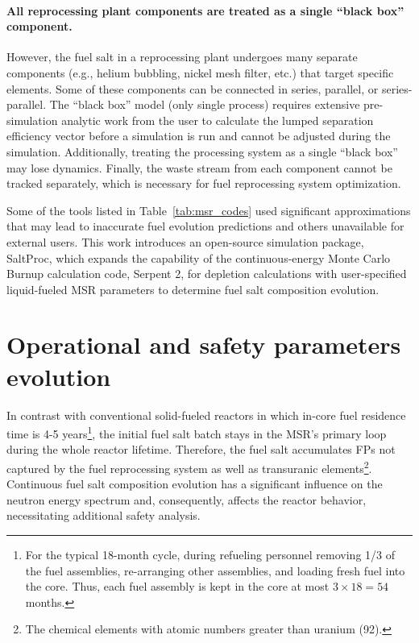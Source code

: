 \paragraph{All reprocessing plant components are treated as a single ``black 
	box'' component.} However, the fuel salt in a reprocessing plant undergoes 
many separate components (e.g., helium bubbling, nickel mesh filter, etc.) 
that target specific elements. Some of these components can be connected in 
series, parallel, or series-parallel. The ``black box'' model (only single 
process) requires extensive pre-simulation analytic work from the user to 
calculate the lumped separation efficiency vector before a simulation is run 
and cannot be adjusted during the simulation. Additionally, treating the 
processing system as a single ``black box'' may lose dynamics. Finally, the 
waste stream from each component cannot be tracked separately, which is 
necessary for fuel reprocessing system optimization.

Some of the tools listed in Table~\ref{tab:msr_codes} used significant  
approximations that may lead to inaccurate fuel evolution predictions and 
others unavailable for external users. This work introduces an 
open-source simulation package, SaltProc, which expands the capability of the 
continuous-energy Monte Carlo Burnup calculation code, Serpent 2, for 
depletion calculations with user-specified liquid-fueled \gls{MSR} parameters 
to determine fuel salt composition evolution.

\section{Operational and safety parameters evolution} 
\label{sec:saf-par-literature}
In contrast with conventional solid-fueled reactors in which in-core fuel 
residence time is 4-5 years\footnote{For the typical 18-month cycle, during 
refueling personnel removing 1/3 of the fuel assemblies, re-arranging other 
assemblies, and loading fresh fuel into the core. Thus, each fuel assembly is 
kept in the core at most $3\times 18=54$ months.}, the initial fuel salt batch 
stays in the \gls{MSR}'s primary loop during the whole reactor lifetime. 
Therefore, the fuel salt accumulates \glspl{FP} not captured by the fuel 
reprocessing system as well as transuranic elements\footnote{The chemical 
elements with atomic numbers greater than uranium (92).}. Continuous fuel 
salt composition evolution has a significant influence on the neutron energy 
spectrum and, consequently, affects the reactor behavior, necessitating 
additional safety analysis.

